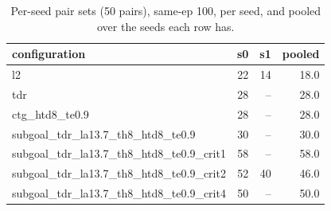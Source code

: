 \begin{table}[H]
\centering\small
\caption{Per-seed pair sets (50 pairs), same-ep 100, per seed, and pooled over the seeds each row has.}
\label{tab:gas-mpc-pooled-same100-perseed-n50}
\begin{tabular}{lrrr}
\toprule
configuration & s0 & s1 & pooled \\
\midrule
l2 & 22 & 14 & 18.0 \\
tdr & 28 & -- & 28.0 \\
ctg\_htd8\_te0.9 & 28 & -- & 28.0 \\
subgoal\_tdr\_la13.7\_th8\_htd8\_te0.9 & 30 & -- & 30.0 \\
subgoal\_tdr\_la13.7\_th8\_htd8\_te0.9\_crit1 & 58 & -- & 58.0 \\
subgoal\_tdr\_la13.7\_th8\_htd8\_te0.9\_crit2 & 52 & 40 & 46.0 \\
subgoal\_tdr\_la13.7\_th8\_htd8\_te0.9\_crit4 & 50 & -- & 50.0 \\
\bottomrule
\end{tabular}
\end{table}

